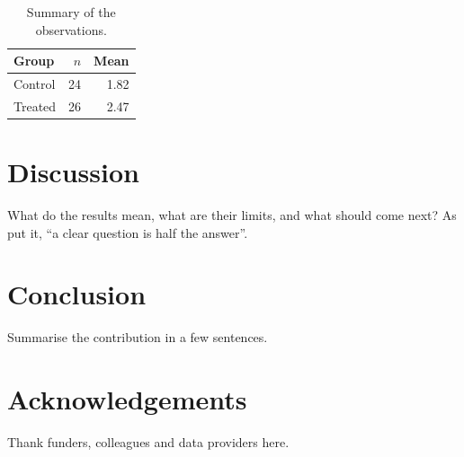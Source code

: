 \documentclass[11pt]{article}
\begin{document}
\begin{table}[htbp]
  \centering
  \caption{Summary of the observations.}
  \label{tab:summary}
  \begin{tabular}{lrr}
    \toprule
    Group   & $n$ & Mean \\
    \midrule
    Control & 24  & 1.82 \\
    Treated & 26  & 2.47 \\
    \bottomrule
  \end{tabular}
\end{table}

\section{Discussion}
What do the results mean, what are their limits, and what should come next?
As \textcite{doe2021} put it, \enquote{a clear question is half the answer}.

\section{Conclusion}
Summarise the contribution in a few sentences.

\section*{Acknowledgements}
Thank funders, colleagues and data providers here.

\printbibliography
\end{document}

